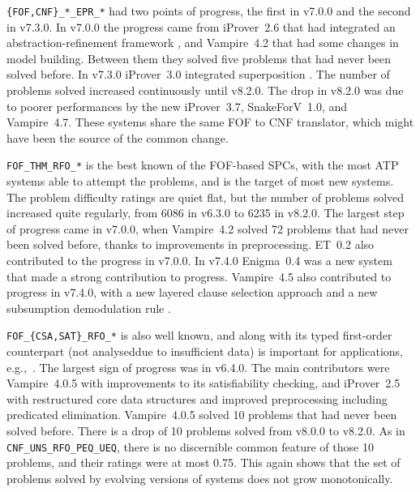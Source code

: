 \documentclass[runningheads]{llncs}
\begin{document}
{\tt \{FOF,CNF\}\_*\_EPR\_*} had two points of progress, the first in v7.0.0 and the second in
v7.3.0.
In v7.0.0 the progress came from iProver~2.6 that had integrated an abstraction-refinement 
framework \cite{HK17}, and Vampire~4.2 that had some changes in model building.
Between them they solved five problems that had never been solved before.
In v7.3.0 iProver~3.0 integrated superposition \cite{DK20}.
The number of problems solved increased continuously until v8.2.0. 
The drop in v8.2.0 
was due to poorer performances by the new iProver~3.7, SnakeForV~1.0, and Vampire~4.7.
These systems share the same FOF to CNF translator, which might have been the source of the
common change.

{\tt FOF\_THM\_RFO\_*} is the best known of the FOF-based SPCs, with the most ATP systems able 
to attempt the problems, and is the target of most new systems.
The problem difficulty ratings are quiet flat, but the number of problems solved increased quite 
regularly, from 6086 in v6.3.0 to 6235 in v8.2.0.
The largest step of progress came in v7.0.0, when Vampire~4.2 solved 72 problems that had never 
been solved before, thanks to improvements in preprocessing.
ET~0.2 \cite{KS+15} also contributed to the progress in v7.0.0.
In v7.4.0 Enigma~0.4 \cite{JU17,JC+20} was a new system that made a strong contribution to 
progress.
Vampire~4.5 also contributed to progress in v7.4.0, with a new layered clause selection approach 
\cite{GS20} and a new subsumption demodulation rule \cite{GKR20}.

{\tt FOF\_\{CSA,SAT\}\_RFO\_*} is also well known, and along with its typed first-order
counterpart (not analyseddue to insufficient data) is important for applications, 
e.g.,~\cite{DKW08}.
The largest sign of progress was in v6.4.0.
The main contributors were Vampire~4.0.5 with improvements to its satisfiability checking,
and iProver~2.5 with restructured core data structures and improved preprocessing including 
predicated elimination.
Vampire~4.0.5 solved 10 problems that had never been solved before.
There is a drop of 10 problems solved from v8.0.0 to v8.2.0.
As in {\tt CNF\_UNS\_RFO\_PEQ\_UEQ}, there is no discernible common feature of those 10 problems,
and their ratings were at most 0.75.
This again shows that the set of problems solved by evolving versions of systems does not grow
monotonically.
\end{document}
